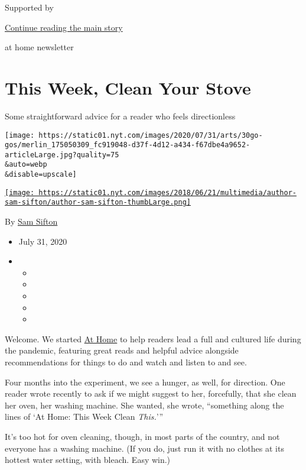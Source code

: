 Supported by

\protect\hyperlink{after-sponsor}{Continue reading the main story}

at home newsletter

\hypertarget{this-week-clean-your-stove}{%
\section{This Week, Clean Your Stove}\label{this-week-clean-your-stove}}

Some straightforward advice for a reader who feels directionless

\texttt{[image: https://static01.nyt.com/images/2020/07/31/arts/30go-gos/merlin\_175050309\_fc919048-d37f-4d12-a434-f67dbe4a9652-articleLarge.jpg?quality=75\\\&auto=webp\\\&disable=upscale]}

\href{https://www.nytimes.com/by/sam-sifton}{\texttt{[image: https://static01.nyt.com/images/2018/06/21/multimedia/author-sam-sifton/author-sam-sifton-thumbLarge.png]}}

By \href{https://www.nytimes.com/by/sam-sifton}{Sam Sifton}

\begin{itemize}
\item
  July 31, 2020
\item
  \begin{itemize}
  \item
  \item
  \item
  \item
  \item
  \end{itemize}
\end{itemize}

Welcome. We started \href{https://www.nytimes.com/spotlight/at-home}{At
Home} to help readers lead a full and cultured life during the pandemic,
featuring great reads and helpful advice alongside recommendations for
things to do and watch and listen to and see.

Four months into the experiment, we see a hunger, as well, for
direction. One reader wrote recently to ask if we might suggest to her,
forcefully, that she clean her oven, her washing machine. She wanted,
she wrote, ``something along the lines of `At Home: This Week Clean
\emph{This.}'''

It's too hot for oven cleaning, though, in most parts of the country,
and not everyone has a washing machine. (If you do, just run it with no
clothes at its hottest water setting, with bleach. Easy win.)

